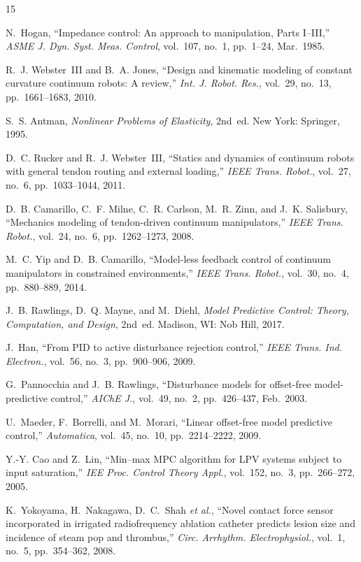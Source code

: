 \begin{thebibliography}{15}

N.~Hogan, ``Impedance control: An approach to manipulation, Parts I--III,'' \emph{ASME J. Dyn. Syst. Meas. Control}, vol.~107, no.~1, pp.~1--24, Mar.\ 1985.

R.~J. Webster~III and B.~A. Jones, ``Design and kinematic modeling of constant curvature continuum robots: A review,'' \emph{Int. J. Robot. Res.}, vol.~29, no.~13, pp.~1661--1683, 2010.

S.~S. Antman, \emph{Nonlinear Problems of Elasticity}, 2nd~ed. New York: Springer, 1995.

D.~C. Rucker and R.~J. Webster~III, ``Statics and dynamics of continuum robots with general tendon routing and external loading,'' \emph{IEEE Trans. Robot.}, vol.~27, no.~6, pp.~1033--1044, 2011.

D.~B. Camarillo, C.~F. Milne, C.~R. Carlson, M.~R. Zinn, and J.~K. Salisbury, ``Mechanics modeling of tendon-driven continuum manipulators,'' \emph{IEEE Trans. Robot.}, vol.~24, no.~6, pp.~1262--1273, 2008.

M.~C. Yip and D.~B. Camarillo, ``Model-less feedback control of continuum manipulators in constrained environments,'' \emph{IEEE Trans. Robot.}, vol.~30, no.~4, pp.~880--889, 2014.

J.~B. Rawlings, D.~Q. Mayne, and M.~Diehl, \emph{Model Predictive Control: Theory, Computation, and Design}, 2nd~ed. Madison, WI: Nob Hill, 2017.

J.~Han, ``From PID to active disturbance rejection control,'' \emph{IEEE Trans. Ind. Electron.}, vol.~56, no.~3, pp.~900--906, 2009.

G.~Pannocchia and J.~B. Rawlings, ``Disturbance models for offset-free model-predictive control,'' \emph{AIChE J.}, vol.~49, no.~2, pp.~426--437, Feb.\ 2003.

U.~Maeder, F.~Borrelli, and M.~Morari, ``Linear offset-free model predictive control,'' \emph{Automatica}, vol.~45, no.~10, pp.~2214--2222, 2009.

Y.-Y. Cao and Z.~Lin, ``Min--max MPC algorithm for LPV systems subject to input saturation,'' \emph{IEE Proc. Control Theory Appl.}, vol.~152, no.~3, pp.~266--272, 2005.

K.~Yokoyama, H.~Nakagawa, D.~C.~Shah \emph{et al.}, ``Novel contact force sensor incorporated in irrigated radiofrequency ablation catheter predicts lesion size and incidence of steam pop and thrombus,'' \emph{Circ. Arrhythm. Electrophysiol.}, vol.~1, no.~5, pp.~354--362, 2008.


\end{thebibliography}
